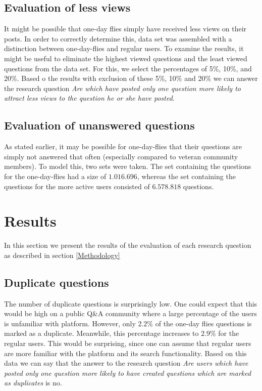 \documentclass[conference]{IEEEtran}
\begin{document}
\subsection{Evaluation of less views}
It might be possible that one-day flies simply have received less views on their posts.
In order to correctly determine this, data set was assembled with a distinction between one-day-flies and regular users. To examine the results, it might be useful to eliminate the highest viewed questions and the least viewed questions  from the data set. For this, we select the percentages of 5\%, 10\%, and 20\%. Based o the results with exclusion of these 5\%, 10\% and 20\% we can answer the research question \textit{Are which have posted only one question more likely to attract less views to the question he or she have posted}.\\


\subsection{Evaluation of unanswered questions}

As stated earlier, it may be possible for one-day-flies that their questions are simply not answered that often (especially compared to veteran community members). To model this, two sets were taken. The set containing the questions for the one-day-flies had a size of $1.016.696$, whereas the set containing the questions for the more active users consisted of $6.578.818$ questions.

\section{Results}

In this section we present the results of the evaluation of each research question as described in section \ref{Methodology}

\subsection{Duplicate questions}

The number of duplicate questions is surprisingly low. One could expect that this would be high on a public Q\&A community where a large percentage of the users is unfamiliar with platform. However, only $2.2\%$ of the one-day flies questions is marked as a duplicate. Meanwhile, this percentage increases to $2.9\%$ for the regular users. This would be surprising, since one can assume that regular users are more familiar with the platform and its search functionality. Based on this data we can say that the answer to the research question \textit{Are users which have posted only one question more likely to have created questions which are marked as duplicates} is no.
\end{document}
